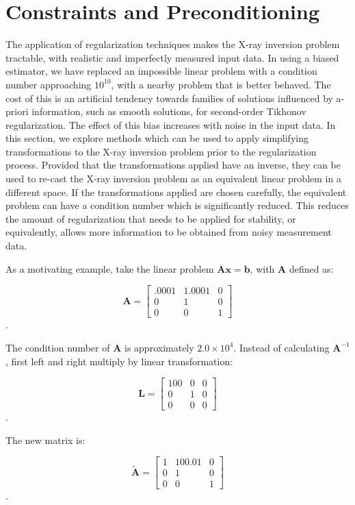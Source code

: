 \section{Constraints and Preconditioning}

The application of regularization techniques makes the X-ray inversion problem tractable, with realistic and imperfectly measured input data. In using a biased estimator, we have replaced an impossible linear problem with a condition number approaching $10^{10}$, with a nearby problem that is better behaved. The cost of this is an artificial tendency towards families of solutions influenced by a-priori information, such as smooth solutions, for second-order Tikhonov regularization. The effect of this bias increases with noise in the input data. In this section, we explore methods which can be used to apply simplifying transformations to the X-ray inversion problem prior to the regularization process. Provided that the transformations applied have an inverse, they can be used to re-cast the X-ray inversion problem as an equivalent linear problem in a different space. If the transformations applied are chosen carefully, the equivalent problem can have a condition number which is significantly reduced. This reduces the amount of regularization that needs to be applied for stability, or equivalently, allows more information to be obtained from noisy measurement data. 

As a motivating example, take the linear problem $\mathbf{A}\mathbf{x} = \mathbf{b}$, with $\mathbf{A}$ defined as:

\[
\mathbf{A} = \begin{bmatrix} 
    .0001 & 1.0001 & 0 \\
    0 & 1 & 0 \\
    0 & 0 & 1
    \end{bmatrix}
\].

The condition number of $\mathbf{A}$ is approximately $2.0\times10^{4}$. Instead of calculating $\mathbf{A}^{-1}$, first left and right multiply by linear transformation:

\[
\mathbf{L} = \begin{bmatrix} 
    100 & 0 & 0  \\
    0 & 1  & 0 \\
    0 & 0 & 0
    \end{bmatrix}
\].

The new matrix is:

\[
\mathbf{\tilde{A}} = \begin{bmatrix} 
    1 & 100.01 & 0  \\
    0 & 1  & 0 \\
    0 & 0 & 1
    \end{bmatrix}
\].

